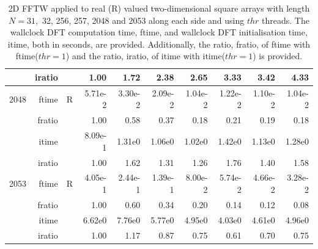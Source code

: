 \documentclass[a4paper]{article}
\begin{document}
\begin{table}[!htbp]
\begin{center}
\begin{small}
\begin{tabular}{|r|r|r|r|r|r|r|r|r|r|}
     & iratio & &       1.00 &   1.72 &   2.38 &   2.65 &   3.33 &   3.42 &   4.33      \\ \hline 
  2048  & ftime & R  &  5.71e-2 &   3.30e-2 &   2.09e-2 &   1.04e-2 &   1.22e-2 &   1.10e-2 &   1.04e-2   \\ 
      & fratio & &      1.00 &   0.58 &   0.37 &   0.18 &   0.21 &   0.19 &   0.18     \\ 
     & itime & &        8.09e-1 &   1.31e0 &   1.06e0 &   1.02e0 &   1.42e0 &   1.13e0 &   1.28e0     \\ 
     & iratio & &       1.00 &   1.62 &   1.31 &   1.26 &   1.76 &   1.40 &   1.58      \\ \hline 
  2053  & ftime & R  &  4.05e-1 &   2.44e-1 &   1.39e-1 &   8.00e-2 &   5.74e-2 &   4.66e-2 &   3.28e-2   \\ 
      & fratio & &      1.00 &   0.60 &   0.34 &   0.20 &   0.14 &   0.12 &   0.08    \\ 
     & itime & &        6.62e0 &   7.76e0 &   5.77e0 &   4.95e0 &   4.03e0 &   4.61e0 &   4.96e0     \\ 
     & iratio & &       1.00 &   1.17 &   0.87 &   0.75 &   0.61 &   0.70 &   0.75      \\ \hline 
\end{tabular}
\caption{2D FFTW applied to real (R)  valued two-dimensional square arrays with length $N=31,$ 32, 256, 257, 2048 and 2053 along each side and using $thr$ threads. The wallclock DFT computation time, ftime, and wallclock DFT initialisation time, itime, both in seconds, are provided. Additionally,  the ratio, fratio, of ftime  with ftime($thr=1$) and the ratio, iratio, of itime  with itime($thr=1$) is provided. }\label{TblFFTW2d}
\end{small}
\end{center}
\end{table}
\end{document}
